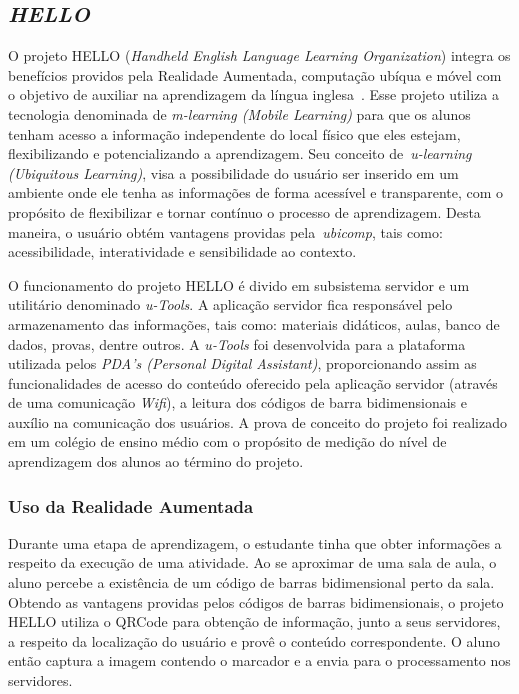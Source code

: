\subsection{\textit{HELLO}}
\label{sec:hello}

	O projeto HELLO (\textit{Handheld English Language Learning Organization}) integra os benefícios
	providos pela Realidade Aumentada, computação ubíqua e móvel com o objetivo de auxiliar na
	aprendizagem da língua inglesa~\cite{tsung}. Esse projeto utiliza a tecnologia denominada de
	\textit{m-learning (Mobile Learning)} para que os alunos tenham acesso a informação independente
	do local físico que eles estejam, flexibilizando e potencializando a aprendizagem. Seu conceito
	de~\textit{u-learning (Ubiquitous Learning)}, visa a possibilidade do usuário ser inserido em um
	ambiente onde ele tenha as informações de forma acessível e transparente, com o propósito de
	flexibilizar e tornar contínuo o processo de aprendizagem. Desta maneira, o usuário obtém
	vantagens providas pela~\textit{ubicomp}, tais como: acessibilidade, interatividade e sensibilidade
	ao contexto.
	
	O funcionamento do projeto HELLO é divido em subsistema servidor e um utilitário denominado
	\textit{u-Tools}. A aplicação servidor fica responsável pelo armazenamento das informações, tais
	como: materiais didáticos, aulas, banco de dados, provas, dentre outros. A \textit{u-Tools} foi
	desenvolvida para a plataforma utilizada pelos \textit{PDA's (Personal Digital Assistant)},
	proporcionando assim as funcionalidades de acesso do conteúdo oferecido pela aplicação servidor
	(através de uma comunicação \textit{Wifi}), a leitura dos códigos de barra bidimensionais e auxílio
	na comunicação dos usuários. A prova de conceito do projeto foi realizado em um colégio de ensino
	médio com o propósito de medição do nível de aprendizagem dos alunos ao término do projeto.
	
	\subsubsection{Uso da Realidade Aumentada}
	
	Durante uma etapa de aprendizagem, o estudante tinha que obter informações a respeito da execução
	de uma atividade. Ao se aproximar de uma sala de aula, o aluno percebe a existência de um código de
	barras bidimensional perto da sala. Obtendo as vantagens providas pelos códigos de barras
	bidimensionais, o projeto HELLO utiliza o QRCode para obtenção de informação, junto a seus
	servidores, a respeito da localização do usuário e provê o conteúdo correspondente. O aluno então
	captura a imagem contendo o marcador e a envia para o processamento nos servidores.

